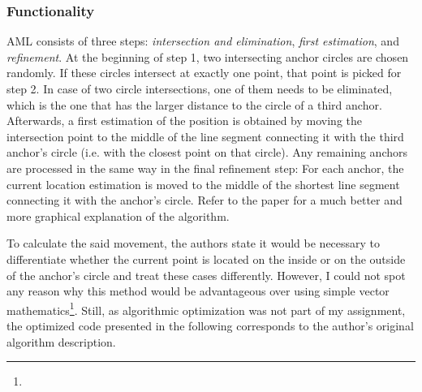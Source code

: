 \subsubsection{Functionality}
AML consists of three steps: \emph{intersection and elimination}, \emph{first estimation}, and \emph{refinement}. At the beginning of step 1, two intersecting anchor circles are chosen randomly. If these circles intersect at exactly one point, that point is picked for step 2. In case of two circle intersections, one of them needs to be eliminated, which is the one that has the larger distance to the circle of a third anchor. Afterwards, a first estimation of the position is obtained by moving the intersection point to the middle of the line segment connecting it with the third anchor's circle (i.e. with the closest point on that circle). 
Any remaining anchors are processed in the same way in the final refinement step: For each anchor, the current location estimation is moved to the middle of the shortest line segment connecting it with the anchor's circle. Refer to the paper for a much better and more graphical explanation of the algorithm.

To calculate the said movement, the authors state it would be necessary to differentiate whether the current point is located on the inside or on the outside of the anchor's circle and treat these cases differently. However, I could not spot any reason why this method would be advantageous over using simple vector mathematics\footnote{}. Still, as algorithmic optimization was not part of my assignment, the optimized code presented in the following corresponds to the author's original algorithm description.

